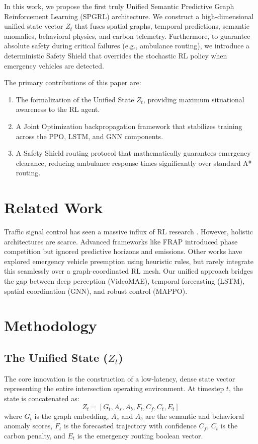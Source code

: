 \documentclass{ieeeaccess}
\begin{document}
In this work, we propose the first truly Unified Semantic Predictive Graph Reinforcement Learning (SPGRL) architecture. We construct a high-dimensional unified state vector $Z_t$ that fuses spatial graphs, temporal predictions, semantic anomalies, behavioral physics, and carbon telemetry. Furthermore, to guarantee absolute safety during critical failures (e.g., ambulance routing), we introduce a deterministic Safety Shield that overrides the stochastic RL policy when emergency vehicles are detected.

The primary contributions of this paper are:
\begin{enumerate}
    \item The formalization of the Unified State $Z_t$, providing maximum situational awareness to the RL agent.
    \item A Joint Optimization backpropagation framework that stabilizes training across the PPO, LSTM, and GNN components.
    \item A Safety Shield routing protocol that mathematically guarantees emergency clearance, reducing ambulance response times significantly over standard A* routing.
\end{enumerate}

\section{Related Work}
\label{sec:related_work}
Traffic signal control has seen a massive influx of RL research \cite{placeholder10}. However, holistic architectures are scarce. Advanced frameworks like FRAP \cite{placeholder11} introduced phase competition but ignored predictive horizons and emissions. Other works have explored emergency vehicle preemption using heuristic rules, but rarely integrate this seamlessly over a graph-coordinated RL mesh. Our unified approach bridges the gap between deep perception (VideoMAE), temporal forecasting (LSTM), spatial coordination (GNN), and robust control (MAPPO).

\section{Methodology}
\label{sec:methodology}

\subsection{The Unified State ($Z_t$)}
The core innovation is the construction of a low-latency, dense state vector representing the entire intersection operating environment. At timestep $t$, the state is concatenated as:
$$Z_t = [G_t, A_s, A_b, F_t, C_f, C_t, E_t]$$
where $G_t$ is the graph embedding, $A_s$ and $A_b$ are the semantic and behavioral anomaly scores, $F_t$ is the forecasted trajectory with confidence $C_f$, $C_t$ is the carbon penalty, and $E_t$ is the emergency routing boolean vector.
\end{document}
